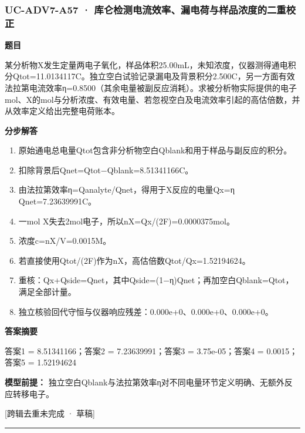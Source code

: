 \documentclass[UTF8,11pt,a4paper]{ctexart}
\begin{document}
\subsubsection*{UC-ADV7-A57 · 库仑检测电流效率、漏电荷与样品浓度的二重校正}
\noindent\textbf{题目}\par
某分析物X发生定量两电子氧化，样品体积25.00mL，未知浓度，仪器测得通电积分Qtot=11.0134117C。独立空白试验记录漏电及背景积分2.500C，另一方面有效法拉第电流效率η=0.8500（其余电量被副反应消耗）。求被分析物实际提供的电子mol、X的mol与分析浓度、有效电量、若忽视空白及电流效率引起的高估倍数，并从效率定义给出完整电荷账本。\par
\medskip\noindent\textbf{分步解答}
\begin{enumerate}
\item 原始通电总电量Qtot包含非分析物空白Qblank和用于样品与副反应的积分。
\item 扣除背景后Qnet=Qtot−Qblank=8.51341166C。
\item 由法拉第效率η=Qanalyte/Qnet，得用于X反应的电量Qx=η Qnet=7.23639991C。
\item 一mol X失去2mol电子，所以nX=Qx/(2F)=0.0000375mol。
\item 浓度c=nX/V=0.0015M。
\item 若直接使用Qtot/(2F)作为nX，高估倍数Qtot/Qx=1.52194624。
\item 重核：Qx+Qside=Qnet，其中Qside=(1−η)Qnet；再加空白Qblank=Qtot，满足全部计量。
\item 独立核验回代守恒与仪器响应残差：0.000e+0、0.000e+0、0.000e+0。
\end{enumerate}
\noindent\textbf{答案摘要}\par
答案1 = 8.51341166；答案2 = 7.23639991；答案3 = 3.75e-05；答案4 = 0.0015；答案5 = 1.52194624\par
\noindent\textbf{模型前提：}
独立空白Qblank与法拉第效率η对不同电量环节定义明确、无额外反应转移电子。\par
\noindent\textcolor{red!65!black}{[跨辑去重未完成 · 草稿]} \par
\medskip\hrule\medskip
{}
\end{document}
